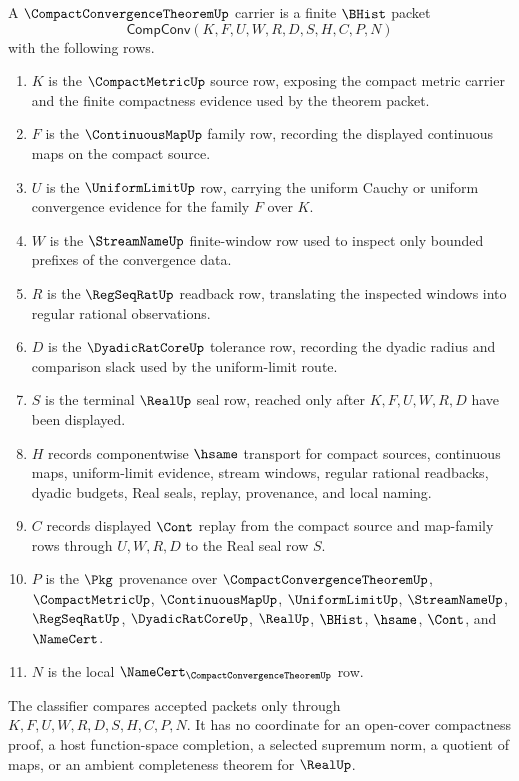 \begin{definition}
\label{def:compact-convergence-theorem-carrier}
A $\CompactConvergenceTheoremUp$ carrier is a finite $\BHist$ packet
$$
\mathsf{CompConv}(K,F,U,W,R,D,S,H,C,P,N)
$$
with the following rows.
\begin{enumerate}
\item $K$ is the $\CompactMetricUp$ source row, exposing the compact metric carrier and the finite compactness evidence used by the theorem packet.
\item $F$ is the $\ContinuousMapUp$ family row, recording the displayed continuous maps on the compact source.
\item $U$ is the $\UniformLimitUp$ row, carrying the uniform Cauchy or uniform convergence evidence for the family $F$ over $K$.
\item $W$ is the $\StreamNameUp$ finite-window row used to inspect only bounded prefixes of the convergence data.
\item $R$ is the $\RegSeqRatUp$ readback row, translating the inspected windows into regular rational observations.
\item $D$ is the $\DyadicRatCoreUp$ tolerance row, recording the dyadic radius and comparison slack used by the uniform-limit route.
\item $S$ is the terminal $\RealUp$ seal row, reached only after $K,F,U,W,R,D$ have been displayed.
\item $H$ records componentwise $\hsame$ transport for compact sources, continuous maps, uniform-limit evidence, stream windows, regular rational readbacks, dyadic budgets, Real seals, replay, provenance, and local naming.
\item $C$ records displayed $\Cont$ replay from the compact source and map-family rows through $U,W,R,D$ to the Real seal row $S$.
\item $P$ is the $\Pkg$ provenance over $\CompactConvergenceTheoremUp$, $\CompactMetricUp$, $\ContinuousMapUp$, $\UniformLimitUp$, $\StreamNameUp$, $\RegSeqRatUp$, $\DyadicRatCoreUp$, $\RealUp$, $\BHist$, $\hsame$, $\Cont$, and $\NameCert$.
\item $N$ is the local $\NameCert_{\CompactConvergenceTheoremUp}$ row.
\end{enumerate}
The classifier compares accepted packets only through $K,F,U,W,R,D,S,H,C,P,N$. It has no coordinate for an open-cover compactness proof, a host function-space completion, a selected supremum norm, a quotient of maps, or an ambient completeness theorem for $\RealUp$.
\end{definition}

